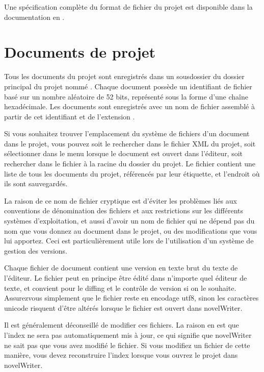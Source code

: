 \documentclass[a4paper,11pt,french]{sphinxmanual}
\begin{document}
\sphinxAtStartPar
Une spécification complète du format de fichier du projet est disponible dans la documentation en .


\section{Documents de projet}
\label{\detokenize{tech_storage:project-documents}}
\sphinxAtStartPar
Tous les documents du projet sont enregistrés dans un sous\sphinxhyphen{}dossier du dossier principal du projet nommé . Chaque document possède un identifiant de fichier basé sur un nombre aléatoire de 52 bits, représenté sous la forme d’une chaîne hexadécimale. Les documents sont enregistrés avec un nom de fichier assemblé à partir de cet identifiant et de l’extension .

\sphinxAtStartPar
Si vous souhaitez trouver l’emplacement du système de fichiers d’un document dans le projet, vous pouvez soit le rechercher dans le fichier XML du projet, soit sélectionner  dans le menu  lorsque le document est ouvert dans l’éditeur, soit rechercher dans le fichier  à la racine du dossier du projet. Le fichier  contient une liste de tous les documents du projet, référencés par leur étiquette, et l’endroit où ils sont sauvegardés.

\sphinxAtStartPar
La raison de ce nom de fichier cryptique est d’éviter les problèmes liés aux conventions de dénomination des fichiers et aux restrictions sur les différents systèmes d’exploitation, et aussi d’avoir un nom de fichier qui ne dépend pas du nom que vous donnez au document dans le projet, ou des modifications que vous lui apportez. Ceci est particulièrement utile lors de l’utilisation d’un système de gestion des versions.

\sphinxAtStartPar
Chaque fichier de document contient une version en texte brut du texte de l’éditeur. Le fichier peut en principe être édité dans n’importe quel éditeur de texte, et convient pour le diffing et le contrôle de version si on le souhaite. Assurez\sphinxhyphen{}vous simplement que le fichier reste en encodage utf\sphinxhyphen{}8, sinon les caractères unicode risquent d’être altérés lorsque le fichier est ouvert dans novelWriter.

\sphinxAtStartPar
Il est généralement déconseillé de modifier ces fichiers. La raison en est que l’index ne sera pas automatiquement mis à jour, ce qui signifie que novelWriter ne sait pas que vous avez modifié le fichier. Si vous modifiez un fichier de cette manière, vous devez reconstruire l’index lorsque vous ouvrez le projet dans novelWriter.
\end{document}
